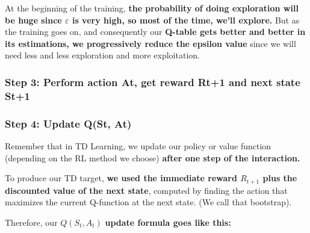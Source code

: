 \documentclass[11pt,a4paper]{article}
\begin{document}
At the beginning of the training, \textbf{the probability of doing exploration will be huge since \(\varepsilon\) is very high, so most of the time, we'll explore.} But as the training goes on, and consequently our \textbf{Q-table gets better and better in its estimations, we progressively reduce the epsilon value} since we will need less and less exploration and more exploitation.


\subsubsection{Step 3: Perform action At, get reward Rt+1 and next state St+1}\label{step-3-perform-action-at-get-reward-rt1-and-next-state-st1}


\subsubsection{Step 4: Update Q(St, At)}\label{step-4-update-qst-at}

Remember that in TD Learning, we update our policy or value function (depending on the RL method we choose) \textbf{after one step of the interaction.}

To produce our TD target, \textbf{we used the immediate reward \(R_{t+1}\) plus the discounted value of the next state}, computed by finding the action that maximizes the current Q-function at the next state. (We call that bootstrap).


Therefore, our \(Q(S_t, A_t)\) \textbf{update formula goes like this:}

\end{document}
